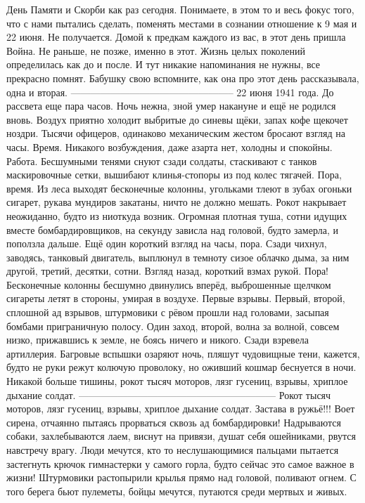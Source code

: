 День Памяти и Скорби как раз сегодня.
Понимаете, в этом то и весь фокус того, что с нами пытались сделать, поменять местами в сознании отношение к 9 мая и 22 июня.
Не получается.
Домой к предкам каждого из вас, в этот день пришла Война.
Не раньше, не позже, именно в этот.
Жизнь целых поколений определилась как до и после.
И тут никакие напоминания не нужны, все прекрасно помнят.
Бабушку свою вспомните, как она про этот день рассказывала, одна и вторая.
--------------------------------------------------
22 июня 1941 года.
До рассвета еще пара часов.
Ночь нежна, зной умер накануне и ещё не родился вновь.
Воздух приятно холодит выбритые до синевы щёки, запах кофе щекочет ноздри.
Тысячи офицеров, одинаково механическим жестом бросают взгляд на часы.
Время.
Никакого возбуждения, даже азарта нет, холодны и спокойны.
Работа.
Бесшумными тенями снуют сзади солдаты, стаскивают с танков маскировочные сетки, вышибают клинья-стопоры из под колес тягачей.
Пора, время.
Из леса выходят бесконечные колонны, угольками тлеют в зубах огоньки сигарет, рукава мундиров закатаны, ничто не должно мешать.
Рокот накрывает неожиданно, будто из ниоткуда возник.
Огромная плотная туша, сотни идущих вместе бомбардировщиков, на секунду зависла над головой, будто замерла, и поползла дальше.
Ещё один короткий взгляд на часы, пора.
Сзади чихнул, заводясь, танковый двигатель, выплюнул в темноту сизое облачко дыма, за ним другой, третий, десятки, сотни.
Взгляд назад, короткий взмах рукой.
Пора!
Бесконечные колонны бесшумно двинулись вперёд, выброшенные щелчком сигареты летят в стороны, умирая в воздухе.
Первые взрывы.
Первый, второй, сплошной ад взрывов, штурмовики с рёвом прошли над головами, засыпая бомбами приграничную полосу.
Один заход, второй, волна за волной, совсем низко, прижавшись к земле, не боясь ничего и никого.
Сзади взревела артиллерия.
Багровые вспышки озаряют ночь, пляшут чудовищные тени, кажется, будто не руки режут колючую проволоку, но оживший кошмар беснуется в ночи.
Никакой больше тишины, рокот тысяч моторов, лязг гусениц, взрывы, хриплое дыхание солдат.
————————————————————
Рокот тысяч моторов, лязг гусениц, взрывы, хриплое дыхание солдат.
Застава в ружьё!!!
Воет сирена, отчаянно пытаясь прорваться сквозь ад бомбардировки!
Надрываются собаки, захлебываются лаем, виснут на привязи, душат себя ошейниками, рвутся навстречу врагу.
Люди мечутся, кто то неслушающимися пальцами пытается застегнуть крючок гимнастерки у самого горла, будто сейчас это самое важное в жизни!
Штурмовики растопырили крылья прямо над головой, поливают огнем.
С того берега бьют пулеметы, бойцы мечутся, путаются среди мертвых и живых.
